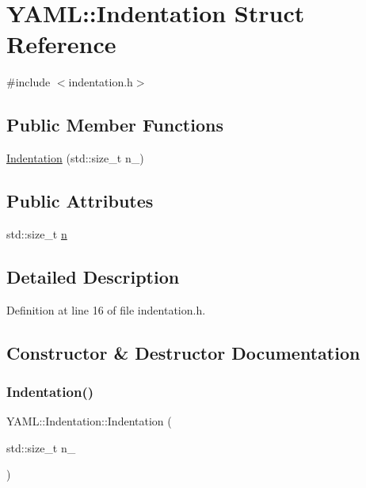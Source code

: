 \hypertarget{struct_y_a_m_l_1_1_indentation}{}\section{Y\+A\+ML\+::Indentation Struct Reference}
\label{struct_y_a_m_l_1_1_indentation}


{\ttfamily \#include $<$indentation.\+h$>$}

\subsection*{Public Member Functions}
\begin{DoxyCompactItemize}
\item 
\mbox{\hyperlink{struct_y_a_m_l_1_1_indentation_a9cc6cdf8094e9bf92295d952abdd1686}{Indentation}} (std\+::size\+\_\+t n\+\_\+)
\end{DoxyCompactItemize}
\subsection*{Public Attributes}
\begin{DoxyCompactItemize}
\item 
std\+::size\+\_\+t \mbox{\hyperlink{struct_y_a_m_l_1_1_indentation_ab50d3105b029c1f9302a2ab0f9b8c150}{n}}
\end{DoxyCompactItemize}


\subsection{Detailed Description}


Definition at line 16 of file indentation.\+h.



\subsection{Constructor \& Destructor Documentation}
\mbox{\label{struct_y_a_m_l_1_1_indentation_a9cc6cdf8094e9bf92295d952abdd1686}} 
\subsubsection{\texorpdfstring{Indentation()}{Indentation()}}
{\footnotesize\ttfamily Y\+A\+M\+L\+::\+Indentation\+::\+Indentation (\begin{DoxyParamCaption}\item[{std\+::size\+\_\+t}]{n\+\_\+ }\end{DoxyParamCaption})\hspace{0.3cm}{\ttfamily [inline]}}



